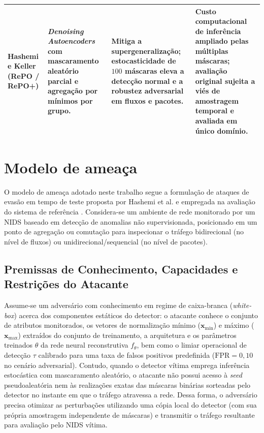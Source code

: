 \documentclass[conference]{IEEEtran}
\begin{document}
\begin{table}[!t]
\begin{tabular}{@{}>{\raggedright\arraybackslash}p{2.8cm}>{\raggedright\arraybackslash}p{3.6cm}>{\raggedright\arraybackslash}p{5.2cm}>{\raggedright\arraybackslash}p{5.2cm}@{}}
\addlinespace
Hashemi e Keller (RePO / RePO+) \cite{hashemi2020} & \textit{Denoising Autoencoders} com mascaramento aleatório parcial e agregação por mínimos por grupo. & Mitiga a supergeneralização; estocasticidade de $100$ máscaras eleva a detecção normal e a robustez adversarial em fluxos e pacotes. & Custo computacional de inferência ampliado pelas múltiplas máscaras; avaliação original sujeita a viés de amostragem temporal e avaliada em único domínio. \\
\bottomrule
\end{tabular}
\end{table}

\section{Modelo de ameaça}

O modelo de ameaça adotado neste trabalho segue a formulação de ataques de evasão em tempo de teste proposta por Hashemi et al. \cite{hashemi2019} e empregada na avaliação do sistema de referência \cite{hashemi2020}.
Considera-se um ambiente de rede monitorado por um NIDS baseado em detecção de anomalias não supervisionada, posicionado em um ponto de agregação ou comutação para inspecionar o tráfego bidirecional (no nível de fluxos) ou unidirecional/sequencial (no nível de pacotes).

\subsection{Premissas de Conhecimento, Capacidades e Restrições do Atacante}

Assume-se um adversário com conhecimento em regime de caixa-branca (\textit{white-box}) acerca dos componentes estáticos do detector: o atacante conhece o conjunto de atributos monitorados, os vetores de normalização mínimo ($\mathbf{x}_{\min}$) e máximo ($\mathbf{x}_{\max}$) extraídos do conjunto de treinamento, a arquitetura e os parâmetros treinados $\theta$ da rede neural reconstrutiva $f_{\theta}$, bem como o limiar operacional de detecção $\tau$ calibrado para uma taxa de falsos positivos predefinida ($\text{FPR} = 0{,}10$ no cenário adversarial).
Contudo, quando o detector vítima emprega inferência estocástica com mascaramento aleatório, o atacante não possui acesso à \textit{seed} pseudoaleatória nem às realizações exatas das máscaras binárias sorteadas pelo detector no instante em que o tráfego atravessa a rede.
Dessa forma, o adversário precisa otimizar as perturbações utilizando uma cópia local do detector (com sua própria amostragem independente de máscaras) e transmitir o tráfego resultante para avaliação pelo NIDS vítima.
\end{document}
